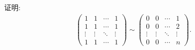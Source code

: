 \documentclass[../../main.tex]{subfiles}%
\begin{document}
\begin{example}
证明:
\begin{align*}
\begin{pmatrix}
1 & 1 & \cdots & 1 \\
1 & 1 & \cdots & 1 \\
\vdots & \vdots & \ddots & \vdots \\
1 & 1 & \cdots & 1
\end{pmatrix}
\sim
\begin{pmatrix}
0 & 0 & \cdots & 1 \\
0 & 0 & \cdots & 2 \\
\vdots & \vdots & \ddots & \vdots \\
0 & 0 & \cdots & n
\end{pmatrix}.
\end{align*} 
\end{example}
\end{document}
